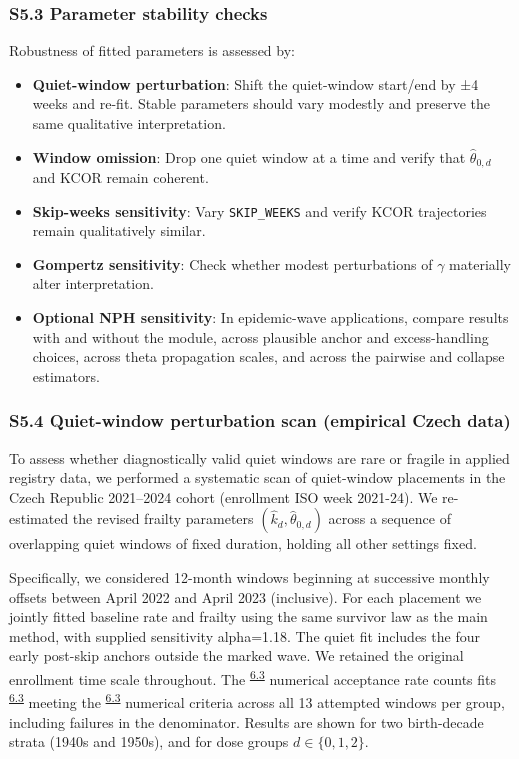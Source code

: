 \documentclass[
]{article}
\providecommand{\tightlist}{%
  \setlength{\itemsep}{0pt}\setlength{\parskip}{0pt}}
\DeclareRobustCommand{\oldword}[1]{\leavevmode{\setbox0=\hbox{#1}\rlap{\raisebox{.5ex}{\rule{\wd0}{.45pt}}}\box0\relax}}
\begin{document}
\subsubsection{S5.3 Parameter stability checks}\label{s5.3-parameter-stability-checks}

Robustness of fitted parameters is assessed by:

\begin{itemize}
\tightlist
\item
  \textbf{Quiet-window perturbation}: Shift the quiet-window start/end by ±4 weeks and re-fit. Stable parameters should vary modestly and preserve the same qualitative interpretation.
\item
  \textbf{Window omission}: Drop one quiet window at a time and verify that \(\hat{\theta}_{0,d}\) and KCOR remain coherent.
\item
  \textbf{Skip-weeks sensitivity}: Vary \texttt{SKIP\_WEEKS} and verify KCOR trajectories remain qualitatively similar.
\item
  \textbf{Gompertz sensitivity}: Check whether modest perturbations of \(\gamma\) materially alter interpretation.
\item
  \textbf{Optional NPH sensitivity}: In epidemic-wave applications, compare results with and without the module, across plausible anchor and excess-handling choices, across theta propagation scales, and across the pairwise and collapse estimators.
\end{itemize}
\subsubsection{S5.4 Quiet-window perturbation scan (empirical Czech data)}\label{s5.4-quiet-window-perturbation-scan-empirical-czech-data}

To assess whether diagnostically valid quiet windows are rare or fragile in applied registry data, we performed a systematic scan of quiet-window placements in the Czech Republic 2021--2024 cohort (enrollment ISO week 2021-24). We re-estimated the revised frailty parameters \((\hat{k}_d,\hat{\theta}_{0,d})\) across a sequence of overlapping quiet windows of fixed duration, holding all other settings fixed.

Specifically, we considered 12-month windows beginning at successive monthly offsets between April 2022 and April 2023 (inclusive). For each placement we jointly fitted baseline rate and frailty using the same survivor law as the main method, with supplied sensitivity alpha=1.18. The quiet fit includes the four early post-skip anchors outside the marked wave. We retained the original enrollment time scale throughout. The \textsuperscript{\hyperlink{issue-6.3}{6.3}}  \oldword{pass} {\color{red}numerical acceptance} rate counts fits \textsuperscript{\hyperlink{issue-6.3}{6.3}}  \oldword{accepted} \oldword{by} {\color{red}meeting} the \textsuperscript{\hyperlink{issue-6.3}{6.3}}  \oldword{pipeline} {\color{red}numerical criteria} across all 13 attempted windows per group, including failures in the denominator. Results are shown for two birth-decade strata (1940s and 1950s), and for dose groups \(d \in \{0,1,2\}\).
\end{document}
